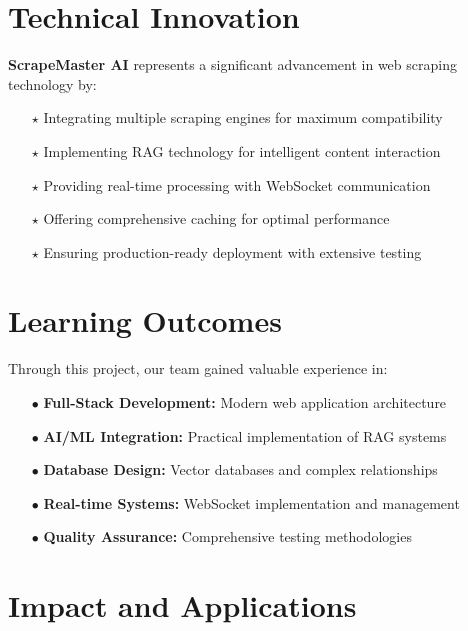 \documentclass[12pt,a4paper]{report}
\begin{document}
\section{Technical Innovation}

\textbf{ScrapeMaster AI} represents a significant advancement in web scraping technology by:

\begin{itemize}[leftmargin=2cm]
    \item[\textcolor{primaryblue}{$\star$}] Integrating multiple scraping engines for maximum compatibility
    \item[\textcolor{primaryblue}{$\star$}] Implementing RAG technology for intelligent content interaction
    \item[\textcolor{primaryblue}{$\star$}] Providing real-time processing with WebSocket communication
    \item[\textcolor{primaryblue}{$\star$}] Offering comprehensive caching for optimal performance
    \item[\textcolor{primaryblue}{$\star$}] Ensuring production-ready deployment with extensive testing
\end{itemize}

\section{Learning Outcomes}

Through this project, our team gained valuable experience in:

\begin{itemize}[leftmargin=2cm]
    \item[\textcolor{secondarygreen}{$\bullet$}] \textbf{Full-Stack Development:} Modern web application architecture
    \item[\textcolor{secondarygreen}{$\bullet$}] \textbf{AI/ML Integration:} Practical implementation of RAG systems
    \item[\textcolor{secondarygreen}{$\bullet$}] \textbf{Database Design:} Vector databases and complex relationships
    \item[\textcolor{secondarygreen}{$\bullet$}] \textbf{Real-time Systems:} WebSocket implementation and management
    \item[\textcolor{secondarygreen}{$\bullet$}] \textbf{Quality Assurance:} Comprehensive testing methodologies
\end{itemize}

\section{Impact and Applications}
\end{document}
